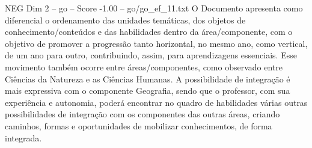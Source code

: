 \begin{textsample}{NEG Dim 2 – go – Score -1.00 – go/go\_ef\_11.txt}
O Documento apresenta como diferencial o ordenamento das unidades temáticas, dos objetos de conhecimento/conteúdos e das habilidades dentro da área/componente, com o objetivo de promover a progressão tanto horizontal, no mesmo ano, como vertical, de um ano para outro, contribuindo, assim, para aprendizagens essenciais.
Esse movimento também ocorre entre áreas/componentes, como observado entre Ciências da Natureza e as Ciências Humanas.
A possibilidade de integração é mais expressiva com o componente Geografia, sendo que o professor, com sua experiência e autonomia, poderá encontrar no quadro de habilidades várias outras possibilidades de integração com os componentes das outras áreas, criando caminhos, formas e oportunidades de mobilizar conhecimentos, de forma integrada.

\end{textsample}
